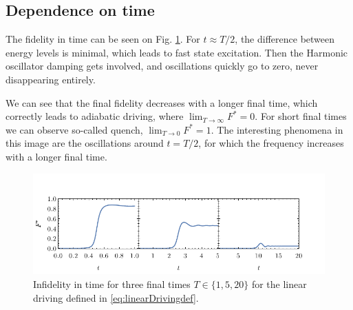 \subsection{Dependence on time}
The fidelity in time can be seen on Fig. \ref{fig:infidelityTimePlotLin}. For $t\approx T/2$, the difference between energy levels is minimal, which leads to fast state excitation. Then the Harmonic oscillator damping gets involved, and oscillations quickly go to zero, never disappearing entirely.

We can see that the final fidelity decreases with a longer final time, which correctly leads to adiabatic driving, where $\lim_{T\rightarrow \infty} F^*=0$. For short final times we can observe so-called quench, $\lim_{T\rightarrow 0} F^*=1$. The interesting phenomena in this image are the oscillations around $t=T/2$, for which the frequency increases with a longer final time. 

\begin{figure}[H]
    \centering 
    \includegraphics[scale=1.185]{../img/infidelityInTimePlot1.pdf}
    \caption{Infidelity in time for three final times $T\in\{1,5,20\}$ for the linear driving defined in \ref{eq:linearDrivingdef}.}
  \label{fig:infidelityTimePlotLin}
\end{figure}


